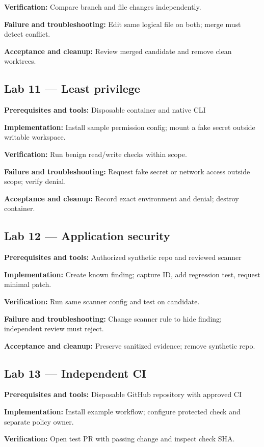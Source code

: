 \documentclass[11pt,letterpaper]{article}
\begin{document}
\textbf{Verification:} Compare branch and file changes independently.

\textbf{Failure and troubleshooting:} Edit same logical file on both; merge must detect conflict.

\textbf{Acceptance and cleanup:} Review merged candidate and remove clean worktrees.

\subsection*{Lab 11 --- Least privilege}
\textbf{Prerequisites and tools:} Disposable container and native CLI

\textbf{Implementation:} Install sample permission config; mount a fake secret outside writable workspace.

\textbf{Verification:} Run benign read/write checks within scope.

\textbf{Failure and troubleshooting:} Request fake secret or network access outside scope; verify denial.

\textbf{Acceptance and cleanup:} Record exact environment and denial; destroy container.

\subsection*{Lab 12 --- Application security}
\textbf{Prerequisites and tools:} Authorized synthetic repo and reviewed scanner

\textbf{Implementation:} Create known finding; capture ID, add regression test, request minimal patch.

\textbf{Verification:} Run same scanner config and test on candidate.

\textbf{Failure and troubleshooting:} Change scanner rule to hide finding; independent review must reject.

\textbf{Acceptance and cleanup:} Preserve sanitized evidence; remove synthetic repo.

\subsection*{Lab 13 --- Independent CI}
\textbf{Prerequisites and tools:} Disposable GitHub repository with approved CI

\textbf{Implementation:} Install example workflow; configure protected check and separate policy owner.

\textbf{Verification:} Open test PR with passing change and inspect check SHA.
\end{document}
